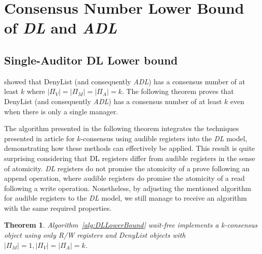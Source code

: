 \documentclass[11pt]{article}
\newtheorem{theorem}{Theorem}
\theoremstyle{definition}
\begin{document}
\section{Consensus Number Lower Bound of \textit{DL} and \textit{ADL}}
\subsection{Single-Auditor DL Lower bound}


\cite{AccessControl} showed that DenyList (and consequently \textit{ADL}) has a consensus number of at least $k$ where $\vert\Pi_V\vert=\vert\Pi_M\vert=\vert\Pi_A\vert=k$. The following theorem proves that DenyList (and consequently \textit{ADL}) has a consensus number of at least $k$ even when there is only a single manager.

The algorithm presented in the following theorem integrates the techniques presented in article \cite{AuditableRegs} for $k$-consensus using audible registers into the \textit{DL} model, demonstrating how these methods can effectively be applied. This result is quite surprising considering that DL registers differ from audible registers in the sense of atomicity. \textit{DL} registers do not promise the atomicity of a prove following an append operation, where audible registers do promise the atomicity of a read following a write operation. Nonetheless, by adjusting the mentioned algorithm for audible registers to the \textit{DL} model, we still manage to receive an algorithm with the same required properties.

\begin{theorem} \label{thm:DLLowerBound}
    Algorithm~\ref{alg:DLLowerBound} wait-free implements a k-consensus object using only R/W registers and DenyList objects with $\vert\Pi_M\vert=1, \vert\Pi_V\vert=\vert\Pi_A\vert=k$.
\end{theorem}
\end{document}
